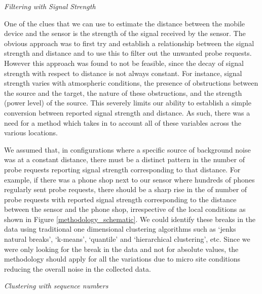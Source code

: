 \vspace{1.5em}\noindent\textit{Filtering with Signal Strength}\vspace{0.5em}

One of the clues that we can use to estimate the distance between the mobile device and the sensor is the strength of the signal received by the sensor.
The obvious approach was to first try and establish a relationship between the signal strength and distance and to use this to filter out the unwanted probe requests.
However this approach was found to not be feasible, since the decay of signal strength with respect to distance is not always constant.
For instance, signal strength varies with atmospheric conditions, the presence of obstructions between the source and the target, the nature of these obstructions, and the strength (power level) of the source.
This severely limits our ability to establish a simple conversion between reported signal strength and distance.
As such, there was a need for a method which takes in to account all of these variables across the various locations.

We assumed that, in configurations where a specific source of background noise was at a constant distance, there must be a distinct pattern in the number of probe requests reporting signal strength corresponding to that distance.
For example, if there was a phone shop next to our sensor where hundreds of phones regularly sent probe requests, there should be a sharp rise in the of number of probe requests with reported signal strength corresponding to the distance between the sensor and the phone shop, irrespective of the local conditions as shown in Figure \ref{methodology_schematic}.
We could identify these breaks in the data using traditional one dimensional clustering algorithms such as `jenks natural breaks', `k-means', `quantile' and `hierarchical clustering', etc.
Since we were only looking for the break in the data and not for absolute values, the methodology should apply for all the variations due to micro site conditions reducing the overall noise in the collected data.

\vspace{1.5em}\noindent\textit{Clustering with sequence numbers}\vspace{0.5em}

